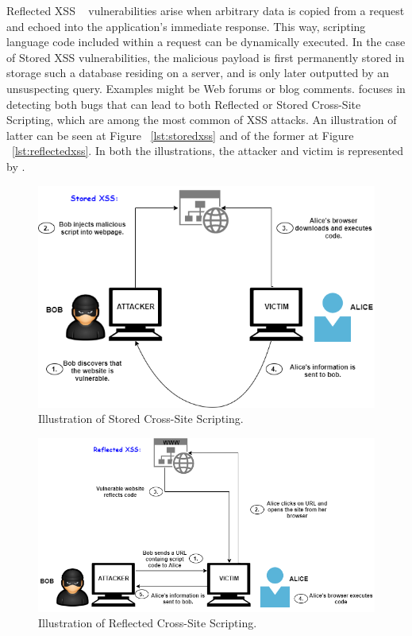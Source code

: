 Reflected XSS ~\cite{rxss_def} vulnerabilities arise when arbitrary data is copied from a request and echoed into the application's immediate response. This way, scripting language code included within a request can be dynamically executed.
In the case of Stored XSS vulnerabilities, the malicious payload is first permanently stored in storage such a database residing on a server, and is only later outputted by an unsuspecting query. Examples might be Web forums or blog comments. 
\pname{} focuses in detecting both bugs that can lead to both Reflected or Stored Cross-Site Scripting, which are among the most common of XSS attacks. An illustration of latter can be seen at Figure ~\ref{lst:storedxss} and of the former at Figure ~\ref{lst:reflectedxss}. In both the illustrations, the attacker and victim is represented by \pname{}.

\begin{figure}[ht]
 \centering
 \captionsetup{justification=centering}
 \includegraphics[width=5.0in]{figures/storedXSS.png}
 \caption{Illustration of Stored Cross-Site Scripting.}
 \label{fig:storedxss}
\end{figure}

\begin{figure}[ht]
 \centering
 \captionsetup{justification=centering}
 \includegraphics[width=5.0in]{figures/reflectedxss.png}
 \caption{Illustration of Reflected Cross-Site Scripting.}
 \label{fig:reflectedxss}
\end{figure}


